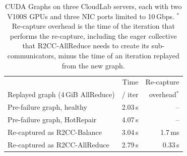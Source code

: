 \begin{table}[t]
\centering
\small
\begin{tabular}{lrr}
\toprule
 & Time & Re-capture \\
Replayed graph (4\,GiB AllReduce) & / iter & overhead$^{*}$ \\
\midrule
Pre-failure graph, healthy & 2.03\,s & -- \\
Pre-failure graph, HotRepair & 4.07\,s & -- \\
Re-captured as R2CC-Balance & 3.04\,s & 1.7\,ms \\
Re-captured as R2CC-AllReduce & 2.79\,s & 0.33\,s \\
\bottomrule
\end{tabular}
\caption{CUDA Graphs on three CloudLab servers, each with two V100S GPUs and three NIC ports limited to 10\,Gbps. $^{*}$Re-capture overhead is the time of the iteration that performs the re-capture, including the eager collective that R2CC-AllReduce needs to create its sub-communicators, minus the time of an iteration replayed from the new graph.}
\label{tab:cuda-graphs}
\end{table}
